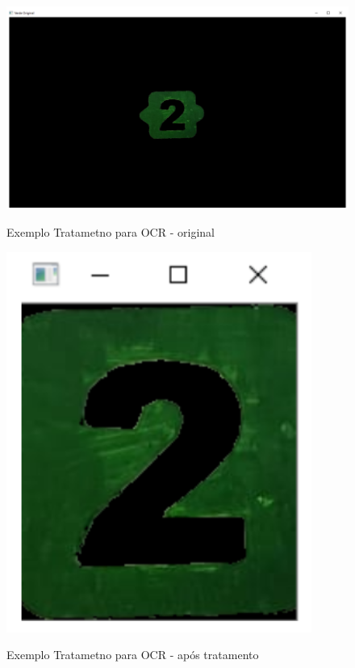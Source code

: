     \begin{figure}[H]
        \caption{Exemplo Tratametno para OCR - original}
        \centering
        \includegraphics[width=\linewidth]{Imagens/Cap4/ex2_original.PNG}
        \label{figura:ex2_original}
    \end{figure}
    
    
    \begin{figure}[H]
        \caption{Exemplo Tratametno para OCR - após tratamento}
        \centering
        \includegraphics[width=10cm]{Imagens/Cap4/ex2_tratado.PNG}
        \label{figura:ex2_tratado}
    \end{figure}
    
